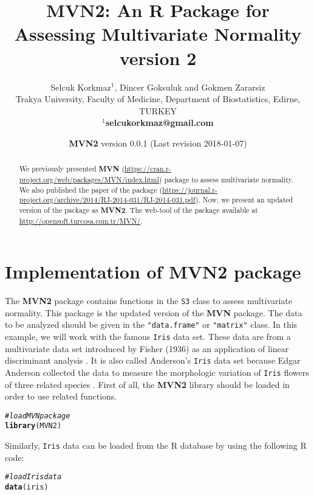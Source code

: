 \documentclass[11pt]{article}\usepackage[]{graphicx}\usepackage[]{color}
\title{MVN2: An R Package for Assessing Multivariate Normality version 2}
\author{Selcuk Korkmaz$^1$, Dincer Goksuluk and Gokmen Zararsiz\\[0.35cm]
\small{Trakya University, Faculty of Medicine, Department of Biostatistics, Edirne, TURKEY}\\[0cm]\textbf{\small{$^1$selcukorkmaz@gmail.com}}
}
\date{\textbf{MVN2} version 0.0.1  (Last revision 2018-01-07)}
\makeatletter
\newcommand{\hlcom}[1]{\textcolor[rgb]{0.678,0.584,0.686}{\textit{#1}}}%
\newcommand{\hlstd}[1]{\textcolor[rgb]{0.345,0.345,0.345}{#1}}%
\newcommand{\hlkwd}[1]{\textcolor[rgb]{0.737,0.353,0.396}{\textbf{#1}}}%
\newenvironment{kframe}{%
 \def\at@end@of@kframe{}%
 \ifinner\ifhmode%
  \def\at@end@of@kframe{\end{minipage}}%
  \begin{minipage}{\columnwidth}%
 \fi\fi%
 \def\FrameCommand##1{\hskip\@totalleftmargin \hskip-\fboxsep
 \colorbox{shadecolor}{##1}\hskip-\fboxsep
     \hskip-\linewidth \hskip-\@totalleftmargin \hskip\columnwidth}%
 \MakeFramed {\advance\hsize-\width
   \@totalleftmargin\z@ \linewidth\hsize
   \@setminipage}}%
 {\par\unskip\endMakeFramed%
 \at@end@of@kframe}
\newenvironment{knitrout}{}{} %
\makeatother
\begin{document}
\maketitle




\begin{abstract}
We previously presented \textbf{MVN} (\url{https://cran.r-project.org/web/packages/MVN/index.html}) package to assess multivariate normality. We also published the paper of the package (\url{https://journal.r-project.org/archive/2014/RJ-2014-031/RJ-2014-031.pdf}). Now, we present an updated version of the package as \textbf{MVN2}. The web-tool of the package available at \url{http://opensoft.turcosa.com.tr/MVN/}.
\end{abstract}



\section{Implementation of MVN2 package} \label{sec:mvnRimplement}
The \textbf{MVN2} package contains functions in the \texttt{S3} class to assess multivariate normality. This package is the updated version of the \textbf{MVN} package. The data to be analyzed should be given in the \texttt{"data.frame"} or \texttt{"matrix"} class. In this example, we will work with the famous \texttt{Iris} data set. These data are from a multivariate data set introduced by Fisher (1936) as an application of linear discriminant analysis \cite{fisher:1936}. It is also called Anderson's \texttt{Iris} data set because Edgar Anderson collected the data to measure the morphologic variation of \texttt{Iris} f\mbox{}lowers of three related species \cite{edgarIris:1936}. First of all, the \textbf{MVN2} library should be loaded in order to use related functions. 


\begin{knitrout}
\color{fgcolor}\begin{kframe}
\begin{alltt}
\hlcom{# load MVN package}
\hlkwd{library}\hlstd{(MVN2)}
\end{alltt}
\end{kframe}
\end{knitrout}

Similarly, \texttt{Iris} data can be loaded from the R database by using the following R code:


\begin{knitrout}
\color{fgcolor}\begin{kframe}
\begin{alltt}
\hlcom{# load Iris data}
\hlkwd{data}\hlstd{(iris)}
\end{alltt}
\end{kframe}
\end{knitrout}
\end{document}
